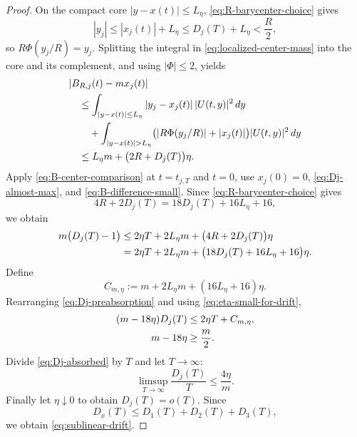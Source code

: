 \documentclass[10pt,a4paper]{amsart}
\newcommand{\dd}{\,d}
\begin{document}
\begin{proof}
On the compact core $|y-x(t)|\le L_\eta$, \eqref{eq:R-barycenter-choice} gives
\begin{equation*}
  |y_j|
  \le |x_j(t)|+L_\eta
  \le D_j(T)+L_\eta
  <\frac R2,
\end{equation*}
so $R\Phi(y_j/R)=y_j$. Splitting the integral in \eqref{eq:localized-center-mass} into the core and its complement, and using $|\Phi|\le2$, yields
\begin{align}
 &|B_{R,j}(t)-m x_j(t)|
\notag\\
 &\quad\le
  \int_{|y-x(t)|\le L_\eta}|y_j-x_j(t)|\,|U(t,y)|^2\dd y
\notag\\
 &\qquad+
  \int_{|y-x(t)|>L_\eta}
  \bigl(|R\Phi(y_j/R)|+|x_j(t)|\bigr)|U(t,y)|^2\dd y
\notag\\
 &\quad\le L_\eta m+\bigl(2R+D_j(T)\bigr)\eta.
  \label{eq:B-center-comparison}
\end{align}
Apply \eqref{eq:B-center-comparison} at $t=t_{j,T}$ and $t=0$, use $x_j(0)=0$, \eqref{eq:Dj-almost-max}, and \eqref{eq:B-difference-small}. Since \eqref{eq:R-barycenter-choice} gives
\begin{equation*}
  4R+2D_j(T)
  =18D_j(T)+16L_\eta+16,
\end{equation*}
we obtain
\begin{align}
  m\bigl(D_j(T)-1\bigr)
  &\le2\eta T+2L_\eta m
  +\bigl(4R+2D_j(T)\bigr)\eta
\notag\\
  &=2\eta T+2L_\eta m
  +\bigl(18D_j(T)+16L_\eta+16\bigr)\eta.
  \label{eq:Dj-preabsorption}
\end{align}
Define
\begin{equation*}
  C_{m,\eta}:=m+2L_\eta m+(16L_\eta+16)\eta.
\end{equation*}
Rearranging \eqref{eq:Dj-preabsorption} and using \eqref{eq:eta-small-for-drift},
\begin{align}
  (m-18\eta)D_j(T)
  &\le2\eta T+C_{m,\eta},
  \label{eq:Dj-absorbed}\\
  m-18\eta&\ge\frac m2.
  \notag
\end{align}
Divide \eqref{eq:Dj-absorbed} by $T$ and let $T\to\infty$:
\begin{equation*}
  \limsup_{T\to\infty}\frac{D_j(T)}T
  \le\frac{4\eta}{m}.
\end{equation*}
Finally let $\eta\downarrow0$ to obtain $D_j(T)=o(T)$. Since
\begin{equation*}
  D_x(T)
  \le D_1(T)+D_2(T)+D_3(T),
\end{equation*}
we obtain \eqref{eq:sublinear-drift}.
\end{proof}
\end{document}
